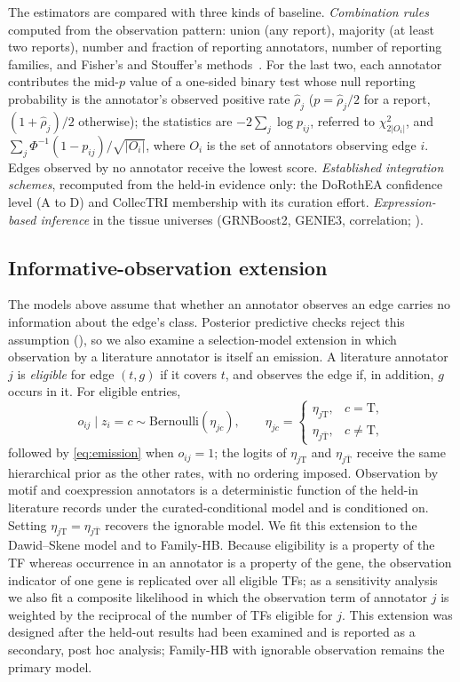 \documentclass[11pt,a4paper]{article}
\begin{document}
The estimators are compared with three kinds of baseline.
\emph{Combination rules} computed from the observation pattern: union (any report), majority (at least two reports), number and fraction of reporting annotators, number of reporting families, and Fisher's and Stouffer's methods~\citep{fisher1932statistical,stouffer1949american}. For the last two, each annotator contributes the mid-$p$ value of a one-sided binary test whose null reporting probability is the annotator's observed positive rate $\hat\rho_j$ ($p=\hat\rho_j/2$ for a report, $(1+\hat\rho_j)/2$ otherwise); the statistics are $-2\sum_j\log p_{ij}$, referred to $\chi^2_{2|O_i|}$, and $\sum_j\Phi^{-1}(1-p_{ij})/\sqrt{|O_i|}$, where $O_i$ is the set of annotators observing edge $i$. Edges observed by no annotator receive the lowest score.
\emph{Established integration schemes}, recomputed from the held-in evidence only: the DoRothEA confidence level (A to D) and CollecTRI membership with its curation effort.
\emph{Expression-based inference} in the tissue universes (GRNBoost2, GENIE3, correlation; ).

\subsection{Informative-observation extension}\label{sec:obsmodel}
The models above assume that whether an annotator observes an edge carries no information about the edge's class.
Posterior predictive checks reject this assumption (), so we also examine a selection-model extension in which observation by a literature annotator is itself an emission.
A literature annotator $j$ is \emph{eligible} for edge $(t,g)$ if it covers $t$, and observes the edge if, in addition, $g$ occurs in it. For eligible entries,
\begin{equation}
  o_{ij}\mid z_i=c \sim \mathrm{Bernoulli}(\eta_{jc}),\qquad \eta_{jc}=\begin{cases}\eta_{j\mathrm{T}}, & c=\mathrm{T},\\ \eta_{j\bar{\mathrm{T}}}, & c\neq \mathrm{T},\end{cases}
  \label{eq:obs}
\end{equation}
followed by \eqref{eq:emission} when $o_{ij}=1$; the logits of $\eta_{j\mathrm{T}}$ and $\eta_{j\bar{\mathrm{T}}}$ receive the same hierarchical prior as the other rates, with no ordering imposed.
Observation by motif and coexpression annotators is a deterministic function of the held-in literature records under the curated-conditional model and is conditioned on.
Setting $\eta_{j\mathrm{T}}=\eta_{j\bar{\mathrm{T}}}$ recovers the ignorable model.
We fit this extension to the Dawid--Skene model and to Family-HB.
Because eligibility is a property of the TF whereas occurrence in an annotator is a property of the gene, the observation indicator of one gene is replicated over all eligible TFs; as a sensitivity analysis we also fit a composite likelihood in which the observation term of annotator $j$ is weighted by the reciprocal of the number of TFs eligible for $j$.
This extension was designed after the held-out results had been examined and is reported as a secondary, post hoc analysis; Family-HB with ignorable observation remains the primary model.
\end{document}
